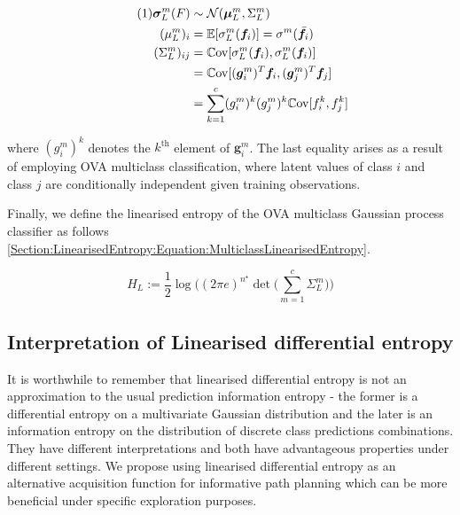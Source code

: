 \documentclass{article}
\renewcommand{\vec}[1]{\boldsymbol{#1}}
\newcommand\numberthis{\addtocounter{equation}{1}\tag{\theequation}}
\begin{document}
			\begin{align*}
			\numberthis \label{Section:LinearisedEntropy:Equation:MomentsLinearisedSoftmax}
					\vec{\sigma}^{m}_{L}(F) & \sim \mathcal{N}(\vec{\mu}^{m}_{L}, \Sigma^{m}_{L}) \\
					(\mu^{m}_{L})_{i} & = \mathbb{E}[\sigma^{m}_{L}(\vec{f}_{i})] =  \sigma^{m}(\bar{\vec{f}}_{i}) \\
					(\Sigma^{m}_{L})_{ij} & = \mathbb{C}\mathrm{ov}[\sigma^{m}_{L}(\vec{f}_{i}), \sigma^{m}_{L}(\vec{f}_{i})] \\
					& = \mathbb{C}\mathrm{ov}[(\vec{g}^{m}_{i})^{T} \vec{f}_{i}, (\vec{g}^{m}_{j})^{T} \vec{f}_{j}] \\
					& = \sum_{k = 1}^{c} (g^{m}_{i})^{k} (g^{m}_{j})^{k} \mathbb{C}\mathrm{ov}[f^{k}_{i}, f^{k}_{j}]
			\end{align*}
						
			where $(g^{m}_{i})^{k}$ denotes the $k^{\text{th}}$ element of $\vec{g}^{m}_{i}$. The last equality arises as a result of employing OVA multiclass classification, where latent values of class $i$ and class $j$ are conditionally independent given training observations.
			
			Finally, we define the linearised entropy of the OVA multiclass Gaussian process classifier as follows \eqref{Section:LinearisedEntropy:Equation:MulticlassLinearisedEntropy}.
			
			\begin{equation}
				H_{L} := \frac{1}{2} \log\Bigg((2 \pi e)^{n^{\star}} \det\bigg(\sum_{m = 1}^{c} \Sigma^{m}_{L}\bigg)\Bigg)
			\label{Section:LinearisedEntropy:Equation:MulticlassLinearisedEntropy}
			\end{equation}			
	
	\subsection{Interpretation of Linearised differential entropy}
	
		It is worthwhile to remember that linearised differential entropy is not an approximation to the usual prediction information entropy - the former is a differential entropy on a multivariate Gaussian distribution and the later is an information entropy on the distribution of discrete class predictions combinations. They have different interpretations and both have advantageous properties under different settings. We propose using linearised differential entropy as an alternative acquisition function for informative path planning which can be more beneficial under specific exploration purposes.
		
\end{document}
